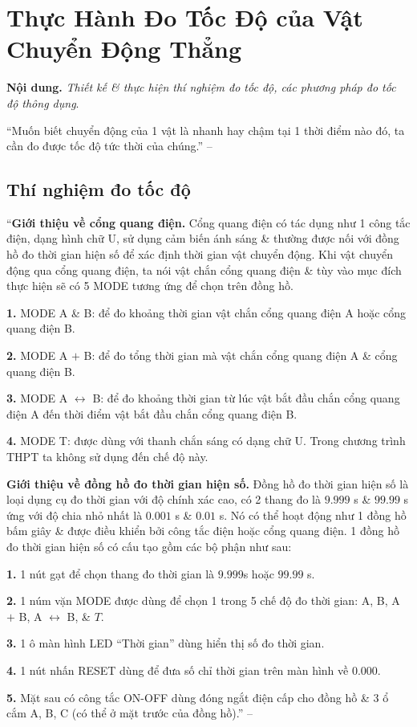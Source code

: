 \documentclass[oneside]{book}
\numberwithin{equation}{section}
\begin{document}
\section{Thực Hành Đo Tốc Độ của Vật Chuyển Động Thẳng}
\textbf{Nội dung.} \textit{Thiết kế \& thực hiện thí nghiệm đo tốc độ, các phương pháp đo tốc độ thông dụng}.

``Muốn biết chuyển động của 1 vật là nhanh hay chậm tại 1 thời điểm nào đó, ta cần đo được tốc độ tức thời của chúng.'' -- \cite[p. 36]{SGK_Vat_Ly_10_Chan_Troi_Sang_Tao}

\subsection{Thí nghiệm đo tốc độ}
``\textbf{Giới thiệu về cổng quang điện.} Cổng quang điện có tác dụng như 1 công tắc điện, dạng hình chữ U, sử dụng cảm biến ánh sáng \& thường được nối với đồng hồ đo thời gian hiện số để xác định thời gian vật chuyển động. Khi vật chuyển động qua cổng quang điện, ta nói vật chắn cổng quang điện \& tùy vào mục đích thực hiện sẽ có 5 MODE tương ứng để chọn trên đồng hồ.
\begin{enumerate*}
	\item[\textbf{1.}] MODE A \& B: để đo khoảng thời gian vật chắn cổng quang điện A hoặc cổng quang điện B.
	\item[\textbf{2.}] MODE A $+$ B: để đo tổng thời gian mà vật chắn cổng quang điện A \& cổng quang điện B.
	\item[\textbf{3.}] MODE A $\leftrightarrow$ B: để đo khoảng thời gian từ lúc vật bắt đầu chắn cổng quang điện A đến thời điểm vật bắt đầu chắn cổng quang điện B.
	\item[\textbf{4.}] MODE T: được dùng với thanh chắn sáng có dạng chữ U. Trong chương trình THPT ta không sử dụng đến chế độ này.
\end{enumerate*}

\noindent\textbf{Giới thiệu về đồng hồ đo thời gian hiện số.} Đồng hồ đo thời gian hiện số là loại dụng cụ đo thời gian với độ chính xác cao, có 2 thang đo là $9.999$ s \& $99.99$ s ứng với độ chia nhỏ nhất là $0.001$ s \& $0.01$ s. Nó có thể hoạt động như 1 đồng hồ bấm giây \& được điều khiển bởi công tắc điện hoặc cổng quang điện. 1 đồng hồ đo thời gian hiện số có cấu tạo gồm các bộ phận như sau:
\begin{enumerate*}
	\item[\textbf{1.}] 1 nút gạt để chọn thang đo thời gian là $9.999$s hoặc $99.99$ s.
	\item[\textbf{2.}] 1 núm vặn MODE được dùng để chọn 1 trong 5 chế độ đo thời gian: A, B, A $+$ B, A $\leftrightarrow$ B, \& $T$.
	\item[\textbf{3.}] 1 ô màn hình LED ``Thời gian'' dùng hiển thị số đo thời gian.
	\item[\textbf{4.}] 1 nút nhấn RESET dùng để đưa số chỉ thời gian trên màn hình về $0.000$.
	\item[\textbf{5.}] Mặt sau có công tắc ON-OFF dùng đóng ngắt điện cấp cho đồng hồ \& 3 ổ cắm A, B, C (có thể ở mặt trước của đồng hồ).'' -- \cite[p. 38]{SGK_Vat_Ly_10_Chan_Troi_Sang_Tao}
\end{enumerate*}
\end{document}
